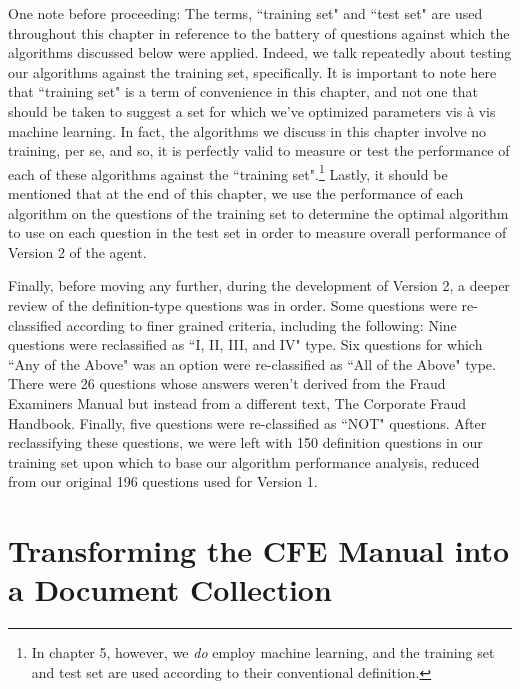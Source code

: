 One note before proceeding:  The terms, ``training set" and ``test set" are used throughout this chapter in reference to the battery of questions against which the algorithms discussed below were applied.  Indeed, we talk repeatedly about testing our algorithms against the training set, specifically. It is important to note here that ``training set" is a term of convenience in this chapter, and not one that should be taken to suggest a set for which we've optimized parameters vis \`a vis machine learning.  In fact, the algorithms we discuss in this chapter involve no training, per se, and so, it is perfectly valid to measure or test the performance of each of these algorithms against the ``training set".\footnote{In chapter 5, however, we \emph{do} employ machine learning, and the training set and test set are used according to their conventional definition.}  Lastly, it should be mentioned that at the end of this chapter, we use the performance of each algorithm on the questions of the training set to determine the optimal algorithm to use on each question in the test set in order to measure overall performance of Version 2 of the agent.

Finally, before moving any further, during the development of Version 2, a deeper review of the definition-type questions was in order.  Some questions were re-classified according to finer grained criteria, including the following:  Nine questions were reclassified as ``I, II, III, and IV" type.  Six questions for which ``Any of the Above" was an option were re-classified as ``All of the Above" type.  There were 26 questions whose answers weren't derived from the Fraud Examiners Manual but instead from a different text, The Corporate Fraud Handbook.  Finally, five questions were re-classified as ``NOT" questions.  After reclassifying these questions, we were left with 150 definition questions in our training set upon which to base our algorithm performance analysis, reduced from our original 196 questions used for Version 1.


\section{Transforming the CFE Manual into a Document Collection}

